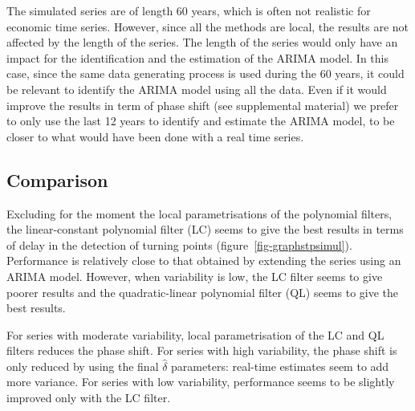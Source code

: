 \documentclass[
]{article}
\newcommand\1{\mathds{1}}
\begin{document}
The simulated series are of length 60 years, which is often not
realistic for economic time series. However, since all the methods are
local, the results are not affected by the length of the series. The
length of the series would only have an impact for the identification
and the estimation of the ARIMA model. In this case, since the same data
generating process is used during the 60 years, it could be relevant to
identify the ARIMA model using all the data. Even if it would improve
the results in term of phase shift (see supplemental material) we prefer
to only use the last 12 years to identify and estimate the ARIMA model,
to be closer to what would have been done with a real time series.

\subsection{Comparison}\label{comparison}

Excluding for the moment the local parametrisations of the polynomial
filters, the linear-constant polynomial filter (LC) seems to give the
best results in terms of delay in the detection of turning points
(figure~\ref{fig-graphstpsimul}). Performance is relatively close to
that obtained by extending the series using an ARIMA model. However,
when variability is low, the LC filter seems to give poorer results and
the quadratic-linear polynomial filter (QL) seems to give the best
results.

For series with moderate variability, local parametrisation of the LC
and QL filters reduces the phase shift. For series with high
variability, the phase shift is only reduced by using the final
\(\hat\delta\) parameters: real-time estimates seem to add more
variance. For series with low variability, performance seems to be
slightly improved only with the LC filter.
\end{document}
